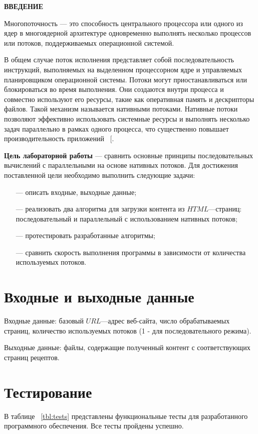 \begin{center}
    \textbf{ВВЕДЕНИЕ}
\end{center}

Многопоточность — это способность центрального процессора или одного из ядер в многоядерной архитектуре одновременно выполнять несколько процессов или потоков, поддерживаемых операционной системой.

В общем случае поток исполнения представляет собой последовательность инструкций, выполняемых на выделенном процессорном ядре и управляемых планировщиком операционной системы. Потоки могут приостанавливаться или блокироваться во время выполнения. Они создаются внутри процесса и совместно используют его ресурсы, такие как оперативная память и дескрипторы файлов. Такой механизм называется нативными потоками. Нативные потоки позволяют эффективно использовать системные ресурсы и выполнять несколько задач параллельно в рамках одного процесса, что существенно повышает производительность приложений ~[\cite{threads}.

\textbf{Цель лабораторной работы} --- сравнить основные принципы последовательных вычислений с параллельными на основе нативных потоков. Для достижения поставленной цели необходимо выполнить следующие задачи:

\begin{itemize}
    \item[---] описать входные, выходные данные;
    \item[---] реализовать два алгоритма для загрузки контента из $HTML$---страниц: последовательный и параллельный с использованием нативных потоков;
    \item[---] протестировать разработанные алгоритмы;
    \item[---] сравнить скорость выполнения программы в зависимости от количества используемых потоков.
\end{itemize}


\chapter{Входные и выходные данные}

Входные данные: базовый $URL$---адрес веб-сайта, число обрабатываемых страниц, количество используемых потоков (1 - для последовательного режима).

Выходные данные: файлы, содержащие полученный контент с соответствующих страниц рецептов.


\chapter{Тестирование}
В таблице ~\ref{tbl:tests} представлены функциональные тесты для разработанного
программного обеспечения. Все тесты пройдены успешно.

